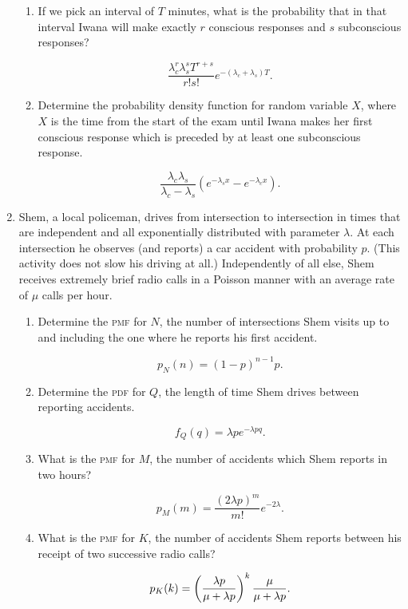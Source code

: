 \begin{enumerate}
\begin{enumerate}
  \item If we pick an interval of \(T\) minutes, what is the probability
    that in that interval Iwana will make exactly \(r\) conscious responses
    and \(s\) subconscious responses?

    \[\frac{\lambda_c^r \lambda_s^s T^{r+s}}{r!s!} e^{-(\lambda_c + \lambda_s) T}.\]

  \item Determine the probability density function for random variable
    \(X\), where \(X\) is the time from the start of the exam until Iwana
    makes her first conscious response which is preceded by at least one
    subconscious response.

    \[\frac{\lambda_c \lambda_s}{\lambda_c - \lambda_s} (e^{-\lambda_sx} - e^{-\lambda_cx}).\]

  \end{enumerate}

\item Shem, a local policeman, drives from intersection to intersection in
  times that are independent and all exponentially distributed with
  parameter \(λ\).  At each intersection he observes (and reports) a car
  accident with probability \(p\).  (This activity does not slow his driving
  at all.)  Independently of all else, Shem receives extremely brief radio
  calls in a Poisson manner with an average rate of \(μ\) calls per hour.
  \begin{enumerate} \parasp
  \item Determine the \textsc{pmf} for \(N\), the number of intersections
    Shem visits up to and including the one where he reports his first
    accident.

    \[p_N(n) = (1-p)^{n-1}p.\]

  \item Determine the \textsc{pdf} for \(Q\), the length of time Shem drives between
    reporting accidents.

    \[f_Q(q) = \lambda p e^{-\lambda p q}.\]

  \item What is the \textsc{pmf} for \(M\), the number of accidents which Shem reports in
    two hours?

    \[p_M(m) = \frac{(2\lambda p)^m}{m!} e^{-2\lambda}.\]

  \item What is the \textsc{pmf} for \(K\), the number of accidents Shem reports between
    his receipt of two successive radio calls?

    \[p_K(k) = \left( \frac{\lambda p}{\mu + \lambda p} \right)^k \frac{\mu}{\mu + \lambda p}.\]


\end{enumerate}
\end{enumerate}

